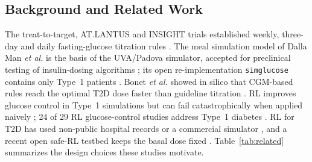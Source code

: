 \documentclass[conference]{IEEEtran}
\begin{document}
\subsection{Background and Related Work}
The treat-to-target, AT.LANTUS and INSIGHT trials established weekly, three-day and daily
fasting-glucose titration rules \cite{riddle2003,davies2005,gerstein2006}. The meal simulation
model of Dalla Man \emph{et al.} \cite{dallaman2007} is the basis of the UVA/Padova simulator,
accepted for preclinical testing of insulin-dosing algorithms \cite{kovatchev2009}; its open
re-implementation \texttt{simglucose} contains only Type~1 patients \cite{simglucose}. Bonet
\emph{et al.} showed in silico that CGM-based rules reach the optimal T2D dose faster than
guideline titration \cite{bonet2025}. RL improves glucose control in Type~1 simulations but can
fail catastrophically when applied naively \cite{fox2020}; 24 of 29 RL glucose-control studies
address Type~1 diabetes \cite{tejedor2020}. RL for T2D has used non-public hospital records
\cite{wang2023} or a commercial simulator \cite{panagiotou2025}, and a recent open safe-RL
testbed keeps the basal dose fixed \cite{kwon2026}. Table~\ref{tab:related} summarizes the
design choices these studies motivate.
\end{document}
